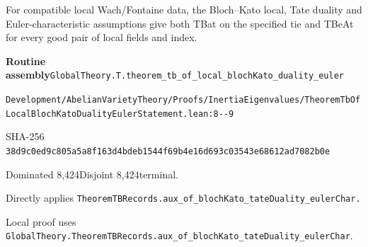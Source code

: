 \begin{formalstatement}[D006]\label{decomp:D006}
For compatible local Wach/Fontaine data, the Bloch–Kato local, Tate duality and Euler-characteristic assumptions give both TBat on the specified tie and TBeAt for every good pair of local fields and index.
\end{formalstatement}
{\small\raggedright\noindent\textsf{\bfseries Routine assembly}\quad \nolinkurl{GlobalTheory.T.theorem_tb_of_local_blochKato_duality_euler}\par\noindent \nolinkurl{Development/AbelianVarietyTheory/Proofs/InertiaEigenvalues/TheoremTbOfLocalBlochKatoDualityEulerStatement.lean:8--9}\par\noindent SHA-256 \nolinkurl{38d9c0ed9c805a5a8f163d4bdeb1544f69b4e16d693c03543e68612ad7082b0e}\par\noindent Dominated 8,424\quad Disjoint 8,424\quad terminal.\par}
Directly applies \nolinkurl{TheoremTBRecords.aux_of_blochKato_tateDuality_eulerChar.}
{\small\raggedright Local proof uses \nolinkurl{GlobalTheory.TheoremTBRecords.aux_of_blochKato_tateDuality_eulerChar}.\par}
